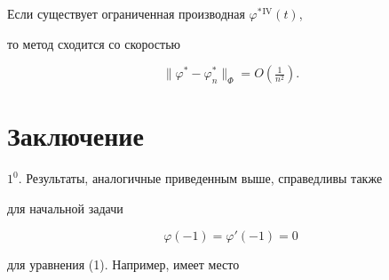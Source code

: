  


\begin{cor} 


Если существует ограниченная производная $\varphi^*{}^{\mathrm{IV}}(t)$, 


то метод сходится со скоростью 


$$ 


\|\varphi^*-\varphi^*_n\|_\Phi=O(\tfrac{1}{n^2}).


$$ 


\end{cor} 


 


 


\section{Заключение} 


 


$1^0$. Результаты, аналогичные приведенным выше, справедливы также 


для начальной задачи 


\begin{equation} 


\varphi(-1)=\varphi'(-1)=0 


\tag{$2'$} 


\end{equation} 


для уравнения (1). Например, имеет место 


\medskip 


 


 


